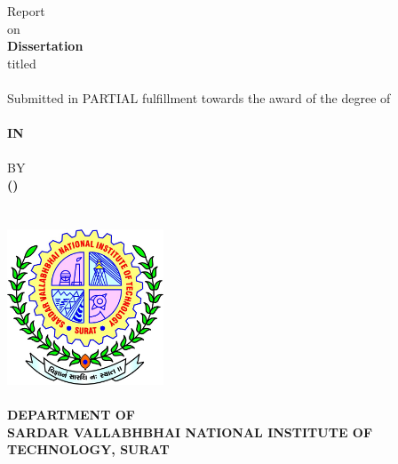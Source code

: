 \thispagestyle{empty}
\BgThispage{}
\begin{center}
    \Large Report 
    \\\vspace{2pt}
    \normalsize on 
    \\\vspace{4pt}
    \textbf{\Large{\DegreeShort{} Dissertation}}
    \\\vspace{4pt}
    titled
    \\\vspace{8pt}
\Large
\textbf{\MakeUppercase{\Title{}}}
    \\\vspace{10pt}
    \normalsize Submitted in PARTIAL fulfillment towards the award of the degree of \\\vspace{7pt}
    \Large \textbf{\MakeUppercase{\Degree{}}\\ \normalsize IN\\\vspace{-5pt}\Large \MakeUppercase{\Subject{}}}\\\vspace{5pt}
   \normalsize BY
    \\\vspace{2pt}
    \Large \textbf{\Atitle{} \Author{} (\MakeUppercase{\Rollno{}})}
\\\vspace{12pt}
    \normalsize {}
\\\vspace{5pt}
\\\vspace{10pt}
\includegraphics[width=0.35\textwidth]{assets/logo.jpg}
\vspace{5pt}\\
\large \Year{}\\\vspace{5pt}
\Large
\textbf{DEPARTMENT OF \MakeUppercase{\Subject}\\\vspace{2pt}
SARDAR VALLABHBHAI NATIONAL INSTITUTE OF TECHNOLOGY, SURAT}
\end{center}
\setcounter{page}{0}
\newpage